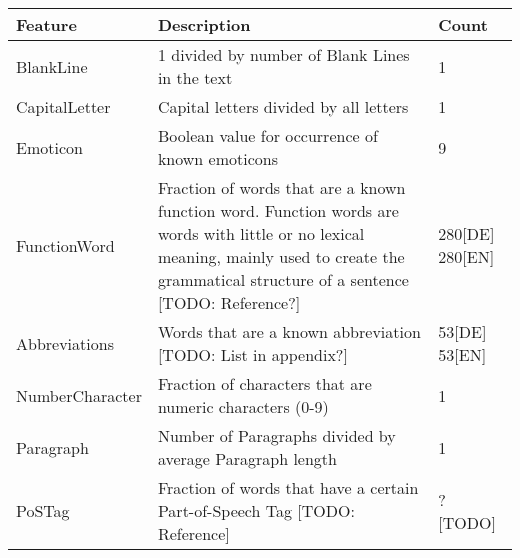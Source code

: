 \begin{table}[tbp]
    \begin{tabular}{|p{2.6cm}|p{8.2cm}|p{1.2cm}|}
    \hline
    Feature              & Description                                                                                                                                                                                    & Count             \\ \hline
    BlankLine            & 1 divided by number of Blank Lines in the text                                                                                                                                     & 1                 \\ \hline
    CapitalLetter        & Capital letters divided by all letters                                                                                                                                             & 1                 \\ \hline
    Emoticon             & Boolean value for occurrence of known emoticons                                                                                                                                                & 9                 \\ \hline
    FunctionWord         & Fraction of words that are a known function word. Function words are words with little or no lexical meaning, mainly used to create the grammatical structure of a sentence [TODO: Reference?] & 280[DE] 280[EN] \\ \hline
    Abbreviations        & Words that are a known abbreviation [TODO: List in appendix?]                                                                                                                      & 53[DE] 53[EN]   \\ \hline
    NumberCharacter      & Fraction of characters that are numeric characters (0-9)                                                                                                                                       & 1                 \\ \hline
    Paragraph            & Number of Paragraphs divided by average Paragraph length                                                                                                                           & 1                 \\ \hline
    PoSTag               & Fraction of words that have a certain Part-of-Speech Tag [TODO: Reference]                                                                                                                     & ? [TODO]          \\ \hline

\end{tabular}
\end{table}
